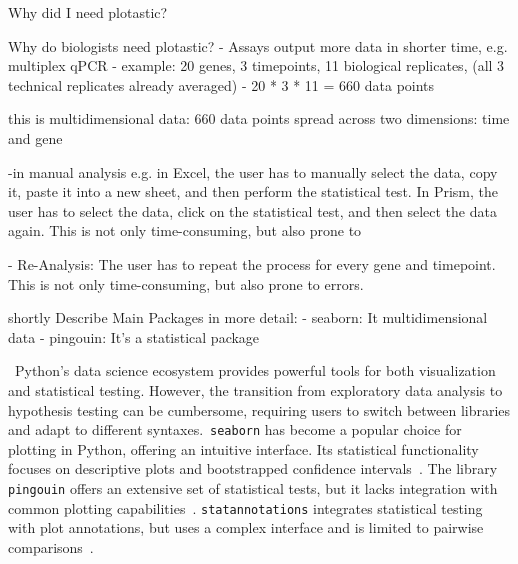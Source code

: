 Why did I need plotastic?

Why do biologists need plotastic?
- Assays output more data in shorter time, e.g. multiplex qPCR
- example: 20 genes, 3 timepoints, 11 biological replicates, (all 3
technical replicates already averaged)
- 20 * 3 * 11 = 660 data points

this is multidimensional data:  660 data points spread across two dimensions: time
and gene

-in manual analysis e.g. in Excel, the user has to manually select the
data, copy it, paste it into a new sheet, and then perform the
statistical test. In Prism, the user has to select the data, click on
the statistical test, and then select the data again. This is not only
time-consuming, but also prone to

- Re-Analysis: The user has to repeat the process for every gene and
timepoint. This is not only time-consuming, but also prone to errors.

shortly Describe Main Packages in more detail:
- seaborn: It multidimensional data
- pingouin: It's a statistical package








\ Python's data science ecosystem provides powerful tools for both visualization
and statistical testing. However, the transition from exploratory data analysis
to hypothesis testing can be cumbersome, requiring users to switch between
libraries and adapt to different syntaxes.~\texttt{seaborn} has become a popular
choice for plotting in Python, offering an intuitive interface. Its statistical
functionality focuses on descriptive plots and bootstrapped confidence
intervals~\cite{waskomSeabornStatisticalData2021}. The library \texttt{pingouin}
offers an extensive set of statistical tests, but it lacks integration with
common plotting capabilities~\cite{vallatPingouinStatisticsPython2018}.
\texttt{statannotations} integrates statistical testing with plot annotations,
but uses a complex interface and is limited to pairwise
comparisons~\cite{charlierTrevismdStatannotationsV02022}.

